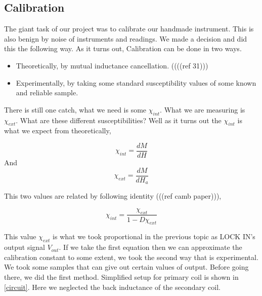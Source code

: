 \subsection{Calibration}
The giant task of our project was to calibrate our handmade instrument. This is also benign by noise of instruments and readings. We made a decision and did this the following way. As it turns out, Calibration can be done in two ways.\cite{cambr} 
\vskip1cm
\begin{itemize}
\item Theoretically, by mutual inductance cancellation. ((((ref 31)))
\vskip1cm
\item Experimentally, by taking some standard susceptibility values of some known and reliable sample.
\end{itemize}
\vskip1cm
There is still one catch, what we need is some $\chi_{int}$\cite{cambr}. What we are measuring is $\chi_{ext}$. What are these different susceptibilities? Well as it turns out the $\chi_{int}$ is what we expect from theoretically, 


\begin{equation*}
\chi_{int} = \frac{dM}{dH}
\end{equation*}
 And 
\begin{equation*}
\chi_{ext} = \frac{dM}{dH_a}
\end{equation*}
 
This two values are related by following identity (((ref camb paper))),

\begin{equation*}
\chi_{int} = \frac{\chi_{ext}}{1-D\chi_{ext}}
\end{equation*}

This value $\chi_{ext}$ is what we took proportional in the previous topic as LOCK IN’s output signal $V_{out}$. If we take the first equation then we can approximate the calibration constant to some extent, we took the second way that is experimental. We took some samples that can give out certain values of output. Before going there, we did the first method. Simplified setup for primary coil is shown in \ref{circuit}. Here we neglected the back inductance of the secondary coil.

